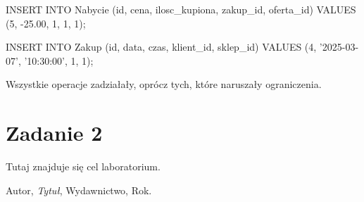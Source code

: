 \documentclass[a4paper,12pt]{article}
\begin{document}
INSERT INTO Nabycie (id, cena, ilosc_kupiona, zakup_id, oferta_id) VALUES (5, -25.00, 1, 1, 1);

INSERT INTO Zakup (id, data, czas, klient_id, sklep_id) VALUES (4, '2025-03-07', '10:30:00', 1, 1);

Wszystkie operacje zadziałały, oprócz tych, które naruszały ograniczenia.

\section{Zadanie 2}
Tutaj znajduje się cel laboratorium.

\begin{thebibliography}{9}
Autor, \textit{Tytuł}, Wydawnictwo, Rok.
\end{thebibliography}
\end{document}
